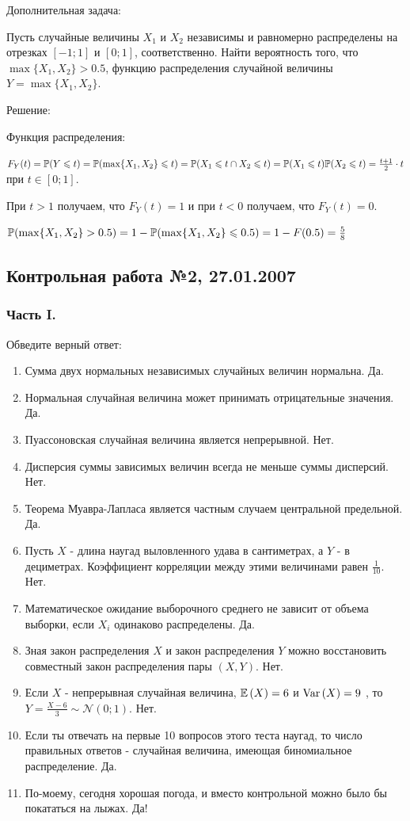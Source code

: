\documentclass[12pt, a4paper]{article}\usepackage[]{graphicx}\usepackage[]{color}
\begin{document}
Дополнительная задача:

Пусть случайные величины $X_{1}$ и $X_{2}$ независимы и равномерно
распределены на отрезках $[-1;1]$ и $[0;1]$, соответственно. Найти
вероятность того, что $\max\{X_{1},X_{2}\}>0.5$, функцию
распределения случайной величины $Y=\max\{X_{1},X_{2}\}$.

Решение:

Функция распределения:

$F_{Y}(t)=\P(Y\le t)=\P(\max\{X_{1},X_{2}\}\le t)=\P(X_{1}\le t\cap X_{2}\le t)=\P(X_{1}\le t)\P(X_{2}\le t)=\frac{t+1}{2}\cdot t$ при $t\in [0;1]$.

При $t>1$ получаем, что $F_{Y}(t)=1$ и при $t<0$ получаем, что $F_{Y}(t)=0$.

$\P(\max\{X_{1},X_{2}\}>0.5)=1-\P(\max\{X_{1},X_{2}\}\le 0.5)=1-F(0.5)=\frac{5}{8}$

\subsection{Контрольная работа №2, 27.01.2007}

\subsubsection*{Часть I.}

Обведите верный ответ:

\begin{enumerate}
\item Сумма двух нормальных независимых случайных величин нормальна.
Да.
\item Нормальная случайная величина может принимать отрицательные
значения. Да.
\item Пуассоновская случайная величина является непрерывной. Нет.
\item Дисперсия суммы зависимых величин всегда не меньше суммы
дисперсий. Нет.
\item Теорема Муавра-Лапласа является частным случаем центральной
предельной. Да.
\item Пусть $X$ - длина наугад выловленного удава в сантиметрах, а
$Y$ - в дециметрах. Коэффициент корреляции между этими
величинами равен $\frac{1}{10}$. Нет.
\item Математическое ожидание выборочного среднего не зависит от
объема выборки, если $X_{i}$ одинаково распределены. Да.
\item Зная закон распределения $X$ и закон распределения $Y$
можно восстановить совместный закон распределения пары $(X,Y)$. Нет.
\item Если  $X$  - непрерывная случайная величина,  $\E\left(X\right)=6$  и
$\Var\left(X\right)=9$ , то  $Y=\frac{X-6}{3} \sim
\mathcal{N}\left(0;1\right)$.  Нет.
\item Если ты отвечать на первые 10 вопросов этого теста наугад, то
число правильных ответов - случайная величина, имеющая
биномиальное распределение. Да.
\item По-моему, сегодня хорошая погода, и вместо контрольной можно
было бы покататься на лыжах. Да!
\end{enumerate}
\end{document}
